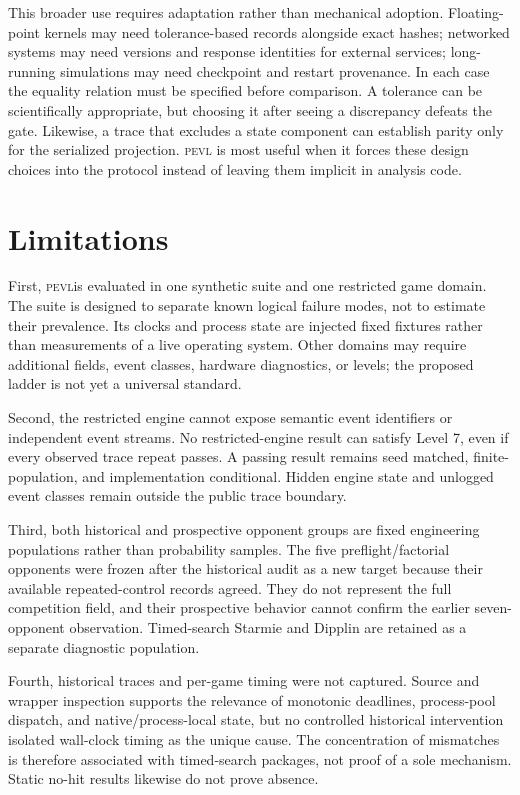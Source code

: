 \documentclass[aps,reprint,superscriptaddress,longbibliography,floatfix]{revtex4-2}
\newcommand{\PEVL}{\textsc{pevl}}
\begin{document}
This broader use requires adaptation rather than mechanical adoption.  Floating-
point kernels may need tolerance-based records alongside exact hashes; networked
systems may need versions and response identities for external services; long-
running simulations may need checkpoint and restart provenance.  In each case
the equality relation must be specified before comparison.  A tolerance can be
scientifically appropriate, but choosing it after seeing a discrepancy defeats
the gate.  Likewise, a trace that excludes a state component can establish
parity only for the serialized projection.  \PEVL{} is most useful when it
forces these design choices into the protocol instead of leaving them implicit
in analysis code.

\section{Limitations}

First, \PEVL is evaluated in one synthetic suite and one restricted game
domain.  The suite is designed to separate known logical failure modes, not to
estimate their prevalence.  Its clocks and process state are injected fixed
fixtures rather than measurements of a live operating system.  Other domains
may require additional fields, event classes, hardware diagnostics, or levels;
the proposed ladder is not yet a universal standard.

Second, the restricted engine cannot expose semantic event identifiers or
independent event streams.  No restricted-engine result can satisfy Level 7,
even if every observed trace repeat passes.  A passing result remains seed
matched, finite-population, and implementation conditional.  Hidden engine
state and unlogged event classes remain outside the public trace boundary.

Third, both historical and prospective opponent groups are fixed engineering
populations rather than probability samples.  The five preflight/factorial
opponents were frozen after the historical audit as a new target because their
available repeated-control records agreed.  They do not represent the full
competition field, and their prospective behavior cannot confirm the earlier
seven-opponent observation.  Timed-search Starmie and Dipplin are retained as a
separate diagnostic population.

Fourth, historical traces and per-game timing were not captured.  Source and
wrapper inspection supports the relevance of monotonic deadlines, process-pool
dispatch, and native/process-local state, but no controlled historical
intervention isolated wall-clock timing as the unique cause.  The concentration
of mismatches is therefore associated with timed-search packages, not proof of
a sole mechanism.  Static no-hit results likewise do not prove absence.
\end{document}
